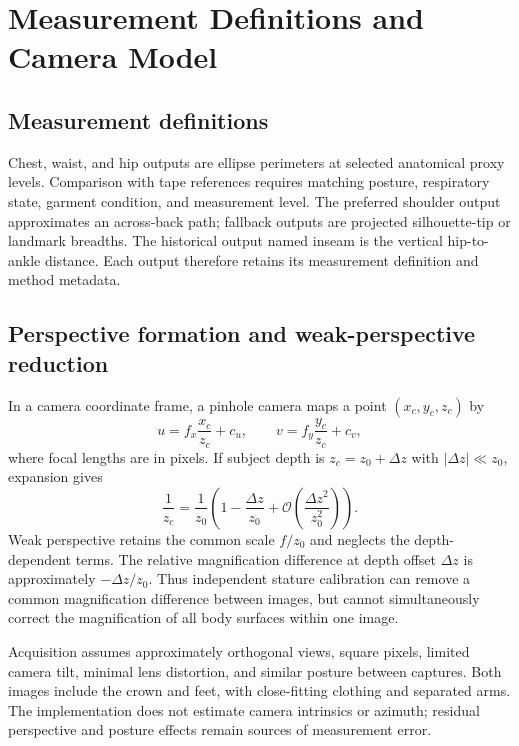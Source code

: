 \documentclass[11pt,a4paper]{article}
\numberwithin{equation}{section}
\begin{document}
\section{Measurement Definitions and Camera Model}
\label{sec:measurement_model}
\subsection{Measurement definitions}
Chest, waist, and hip outputs are ellipse perimeters at selected anatomical proxy levels. Comparison with tape references requires matching posture, respiratory state, garment condition, and measurement level. The preferred shoulder output approximates an across-back path; fallback outputs are projected silhouette-tip or landmark breadths. The historical output named inseam is the vertical hip-to-ankle distance. Each output therefore retains its measurement definition and method metadata.

\subsection{Perspective formation and weak-perspective reduction}
In a camera coordinate frame, a pinhole camera maps a point $(x_c,y_c,z_c)$ by
\begin{equation}
u=f_x\frac{x_c}{z_c}+c_u,\qquad v=f_y\frac{y_c}{z_c}+c_v,
\label{eq:pinhole}
\end{equation}
where focal lengths are in pixels. If subject depth is $z_c=z_0+\Delta z$ with $|\Delta z|\ll z_0$, expansion gives
\begin{equation}
\frac{1}{z_c}=\frac{1}{z_0}\left(1-\frac{\Delta z}{z_0}+\mathcal O\left(\frac{\Delta z^2}{z_0^2}\right)\right).
\end{equation}
Weak perspective retains the common scale $f/z_0$ and neglects the depth-dependent terms. The relative magnification difference at depth offset $\Delta z$ is approximately $-\Delta z/z_0$. Thus independent stature calibration can remove a common magnification difference between images, but cannot simultaneously correct the magnification of all body surfaces within one image.

Acquisition assumes approximately orthogonal views, square pixels, limited camera tilt, minimal lens distortion, and similar posture between captures. Both images include the crown and feet, with close-fitting clothing and separated arms. The implementation does not estimate camera intrinsics or azimuth; residual perspective and posture effects remain sources of measurement error.
\end{document}
